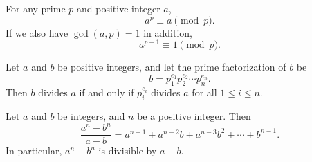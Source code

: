\begin{theorem}
    \label{thm: FLT}
    For any prime $p$ and positive integer $a$,
    \[ a^p \equiv a \pmod{p}.\] 
    If we also have $\gcd(a, p) = 1$ in addition,
    \[ a^{p - 1} \equiv 1 \pmod{p}.\]
\end{theorem}

\begin{lemma}
    \label{lem: weakCRT}
    Let $a$ and $b$ be positive integers, and let the prime factorization of $b$ be
    \[ b = p_1^{e_1} p_2^{e_2} \cdots p_n^{e_n}.\]
    Then $b$ divides $a$ if and only if $p_i^{e_i}$ divides $a$ for all $1 \leq i \leq n$.
\end{lemma}

\begin{lemma}
    \label{lem: divisibilityGP}
    Let $a$ and $b$ be integers, and $n$ be a positive integer. Then 
    \[ \frac{a^n - b^n}{a - b} = a^{n - 1} + a^{n - 2}b + a^{n - 3}b^2 + \cdots + b^{n - 1}. \]
    In particular, $a^n - b^n$ is divisible by $a - b$.
\end{lemma}

\begin{theorem}
    \label{thm: legendre}
\end{theorem}

\begin{lemma}[Euclid]
    \label{lem: euclid}
\end{lemma}

\begin{technique}
    \label{teq: euclideanalg}
\end{technique}